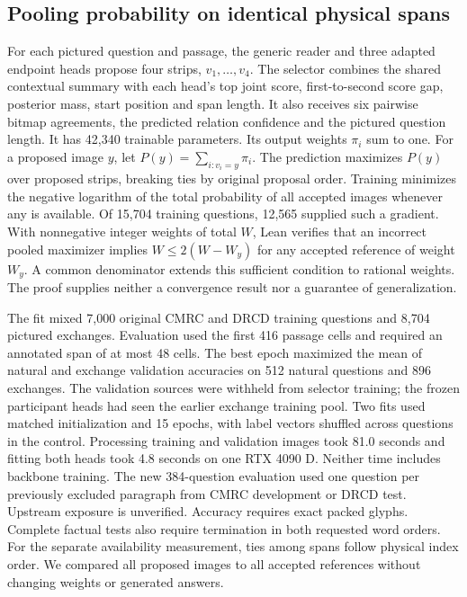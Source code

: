 \subsection*{Pooling probability on identical physical spans}
For each pictured question and passage, the generic reader and three adapted endpoint heads propose four strips, $v_1,\ldots,v_4$. The selector combines the shared contextual summary with each head's top joint score, first-to-second score gap, posterior mass, start position and span length. It also receives six pairwise bitmap agreements, the predicted relation confidence and the pictured question length. It has 42,340 trainable parameters. Its output weights $\pi_i$ sum to one. For a proposed image $y$, let $P(y)=\sum_{i:v_i=y}\pi_i$. The prediction maximizes $P(y)$ over proposed strips, breaking ties by original proposal order. Training minimizes the negative logarithm of the total probability of all accepted images whenever any is available. Of 15,704 training questions, 12,565 supplied such a gradient. With nonnegative integer weights of total $W$, Lean verifies that an incorrect pooled maximizer implies $W\leq 2(W-W_y)$ for any accepted reference of weight $W_y$. A common denominator extends this sufficient condition to rational weights. The proof supplies neither a convergence result nor a guarantee of generalization.

The fit mixed 7,000 original CMRC and DRCD training questions and 8,704 pictured exchanges. Evaluation used the first 416 passage cells and required an annotated span of at most 48 cells. The best epoch maximized the mean of natural and exchange validation accuracies on 512 natural questions and 896 exchanges. The validation sources were withheld from selector training; the frozen participant heads had seen the earlier exchange training pool. Two fits used matched initialization and 15 epochs, with label vectors shuffled across questions in the control. Processing training and validation images took 81.0 seconds and fitting both heads took 4.8 seconds on one RTX 4090 D. Neither time includes backbone training. The new 384-question evaluation used one question per previously excluded paragraph from CMRC development or DRCD test. Upstream exposure is unverified. Accuracy requires exact packed glyphs. Complete factual tests also require termination in both requested word orders. For the separate availability measurement, ties among spans follow physical index order. We compared all proposed images to all accepted references without changing weights or generated answers.

